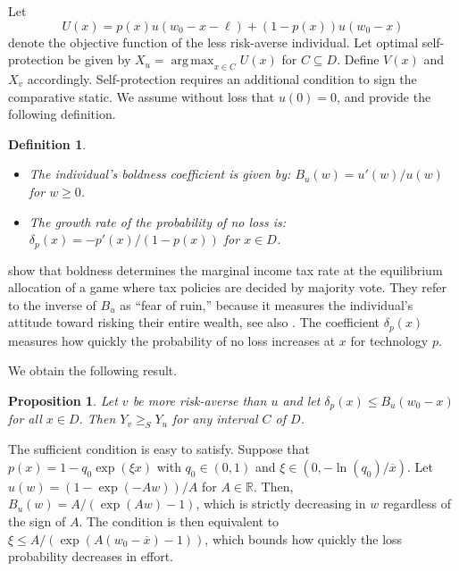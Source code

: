 \documentclass[11pt]{article}
\newtheorem{proposition}[theorem]{Proposition}
\newtheorem{defi}[theorem]{Definition}
\DeclareMathOperator*{\argmax}{arg\,max}
\newcommand{\ol}{\overline}
\begin{document}
Let 
	$$ U(x)=p(x)u(w_0-x-\ell)+(1-p(x))u(w_0-x) $$
denote the objective function of the less risk-averse individual. Let optimal self-protection be given by $X_u=\argmax_{x \in C} U(x)$ for $C \subseteq D$. Define $V(x)$ and $X_v$ accordingly. Self-protection requires an additional condition to sign the comparative static. We assume without loss that $u(0)=0$, and provide the following definition.
\begin{defi}\hspace{1em}
	\begin{itemize}
		\item[(i)] \citep{aumann1977power} The individual's boldness coefficient is given by: $B_u(w) = u'(w)/u(w)$ for $w \geq 0$.
		\item[(ii)] The growth rate of the probability of no loss is: $\delta_p(x)=-p'(x)/(1-p(x))$ for $x \in D$.
	\end{itemize} 
\end{defi}

\cite{aumann1977power} show that boldness determines the marginal income tax rate at the equilibrium allocation of a game where tax policies are decided by majority vote. They refer to the inverse of $B_u$ as ``fear of ruin,'' because it measures the individual's attitude toward risking their entire wealth, see also \cite{foncel2005fear}. The coefficient $\delta_p(x)$ measures how quickly the probability of no loss increases at $x$ for technology $p$.

We obtain the following result.
\begin{proposition}\label{prop:SP}
	Let $v$ be more risk-averse than $u$ and let $\delta_p(x) \leq B_u(w_0-x)$ for all $x \in D$. Then $Y_v \geq_S Y_u$ for any interval $C$ of $D$.
\end{proposition}

The sufficient condition is easy to satisfy. Suppose that $p(x)=1-q_0 \exp(\xi x)$ with $q_0 \in (0,1)$ and $\xi \in (0,-\ln(q_0)/\ol{x})$. Let $u(w) = (1-\exp(-Aw))/A$ for $A \in \mathbb{R}$. Then, $B_u(w) = A/(\exp(Aw)-1)$, which is strictly decreasing in $w$ regardless of the sign of $A$. The condition is then equivalent to $\xi \leq A/(\exp(A(w_0-\ol{x})-1))$, which bounds how quickly the loss probability decreases in effort. 
\end{document}
